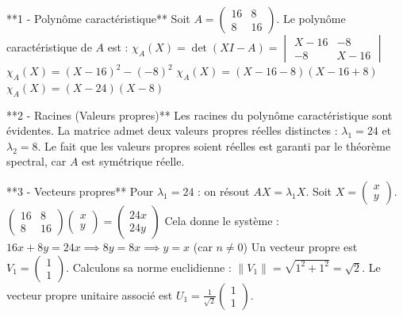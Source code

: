 \documentclass[11pt,a4paper]{article}
\begin{document}
**1 - Polynôme caractéristique**
Soit $A = \begin{pmatrix} 16 & 8 \\ 8 & 16 \end{pmatrix}$.
Le polynôme caractéristique de $A$ est :
$\chi_A(X) = \det(X I - A) = \begin{vmatrix} X - 16 & -8 \\ -8 & X - 16 \end{vmatrix}$
$\chi_A(X) = (X - 16)^2 - (-8)^2$
$\chi_A(X) = (X - 16 - 8)(X - 16 + 8)$
$\chi_A(X) = (X - 24)(X - 8)$

**2 - Racines (Valeurs propres)**
Les racines du polynôme caractéristique sont évidentes. La matrice admet deux valeurs propres réelles distinctes :
$\lambda_1 = 24$ et $\lambda_2 = 8$.
Le fait que les valeurs propres soient réelles est garanti par le théorème spectral, car $A$ est symétrique réelle.

**3 - Vecteurs propres**
Pour $\lambda_1 = 24$ : on résout $AX = \lambda_1 X$.
Soit $X = \begin{pmatrix} x \\ y \end{pmatrix}$.
$\begin{pmatrix} 16 & 8 \\ 8 & 16 \end{pmatrix} \begin{pmatrix} x \\ y \end{pmatrix} = \begin{pmatrix} 24x \\ 24y \end{pmatrix}$
Cela donne le système :
$16x + 8y = 24x \implies 8y = 8x \implies y = x$ (car $n \neq 0$)
Un vecteur propre est $V_1 = \begin{pmatrix} 1 \\ 1 \end{pmatrix}$.
Calculons sa norme euclidienne : $\|V_1\| = \sqrt{1^2 + 1^2} = \sqrt{2}$.
Le vecteur propre unitaire associé est $U_1 = \frac{1}{\sqrt{2}} \begin{pmatrix} 1 \\ 1 \end{pmatrix}$.
\end{document}
